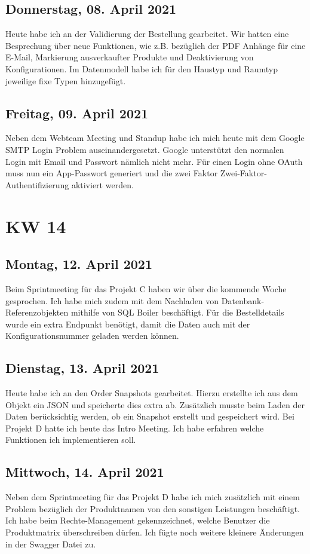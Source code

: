 \section{Donnerstag, 08. April 2021}
Heute habe ich an der Validierung der Bestellung gearbeitet. Wir hatten eine Besprechung über neue Funktionen, wie z.B. bezüglich der PDF Anhänge für eine E-Mail, Markierung ausverkaufter Produkte und Deaktivierung von Konfigurationen. Im Datenmodell habe ich für den Haustyp und Raumtyp jeweilige fixe Typen hinzugefügt.

\section{Freitag, 09. April 2021}
Neben dem Webteam Meeting und Standup habe ich mich heute mit dem Google SMTP Login Problem auseinandergesetzt. Google unterstützt den normalen Login mit Email und Passwort nämlich nicht mehr. Für einen Login ohne OAuth muss nun ein App-Passwort generiert und die zwei Faktor Zwei-Faktor-Authentifizierung aktiviert werden.


\chapter{KW 14}

\section{Montag, 12. April 2021}
Beim Sprintmeeting für das Projekt C haben wir über die kommende Woche gesprochen. Ich habe mich zudem mit dem Nachladen von Datenbank-Referenzobjekten mithilfe von SQL Boiler beschäftigt. Für die Bestelldetails wurde ein extra Endpunkt benötigt, damit die Daten auch mit der Konfigurationsnummer geladen werden können.

\section{Dienstag, 13. April 2021}
Heute habe ich an den Order Snapshots gearbeitet. Hierzu erstellte ich aus dem Objekt ein JSON und speicherte dies extra ab. Zusätzlich musste beim Laden der Daten berücksichtig werden, ob ein Snapshot erstellt und gespeichert wird. Bei Projekt D hatte ich heute das Intro Meeting. Ich habe erfahren welche Funktionen ich implementieren soll.

\section{Mittwoch, 14. April 2021}
Neben dem Sprintmeeting für das Projekt D habe ich mich zusätzlich mit einem Problem bezüglich der Produktnamen von den sonstigen Leistungen beschäftigt. Ich habe beim Rechte-Management gekennzeichnet, welche Benutzer die Produktmatrix überschreiben dürfen. Ich fügte noch weitere kleinere Änderungen in der Swagger Datei zu.

